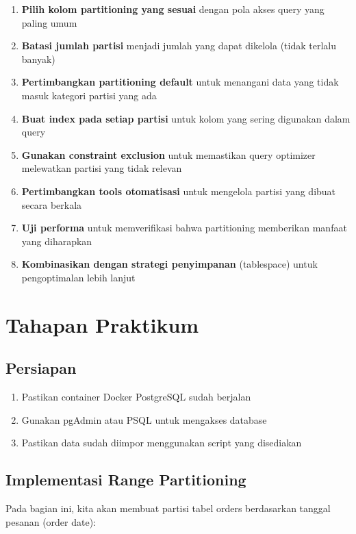 \begin{enumerate}
    \item \textbf{Pilih kolom partitioning yang sesuai} dengan pola akses query yang paling umum
    \item \textbf{Batasi jumlah partisi} menjadi jumlah yang dapat dikelola (tidak terlalu banyak)
    \item \textbf{Pertimbangkan partitioning default} untuk menangani data yang tidak masuk kategori partisi yang ada
    \item \textbf{Buat index pada setiap partisi} untuk kolom yang sering digunakan dalam query
    \item \textbf{Gunakan constraint exclusion} untuk memastikan query optimizer melewatkan partisi yang tidak relevan
    \item \textbf{Pertimbangkan tools otomatisasi} untuk mengelola partisi yang dibuat secara berkala
    \item \textbf{Uji performa} untuk memverifikasi bahwa partitioning memberikan manfaat yang diharapkan
    \item \textbf{Kombinasikan dengan strategi penyimpanan} (tablespace) untuk pengoptimalan lebih lanjut
\end{enumerate}

\section{Tahapan Praktikum}

\subsection{Persiapan}
\begin{enumerate}
	\item Pastikan container Docker PostgreSQL sudah berjalan
	\item Gunakan pgAdmin atau PSQL untuk mengakses database
	\item Pastikan data sudah diimpor menggunakan script yang disediakan
\end{enumerate}

\subsection{Implementasi Range Partitioning}
Pada bagian ini, kita akan membuat partisi tabel orders berdasarkan tanggal pesanan (order date):

